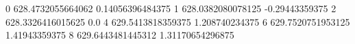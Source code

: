 0 628.4732055664062 0.14056396484375
1 628.0382080078125 -0.29443359375
2 628.3326416015625 0.0
4 629.5413818359375 1.208740234375
6 629.7520751953125 1.41943359375
8 629.6443481445312 1.31170654296875
